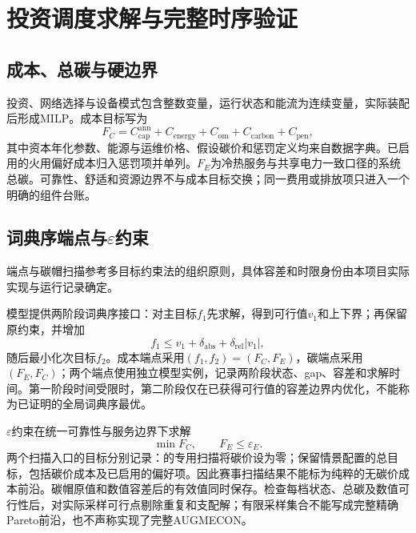\section{投资调度求解与完整时序验证}

\subsection{成本、总碳与硬边界}

投资、网络选择与设备模式包含整数变量，运行状态和能流为连续变量，实际装配后形成MILP。成本目标写为
\begin{equation}
F_C=C_{\mathrm{cap}}^{\mathrm{ann}}+C_{\mathrm{energy}}
+C_{\mathrm{om}}+C_{\mathrm{carbon}}+C_{\mathrm{pen}},
\label{eq:cost-objective}
\end{equation}
其中资本年化参数、能源与运维价格、假设碳价和惩罚定义均来自数据字典。已启用的火用偏好成本归入惩罚项并单列。$F_E$为冷热服务与共享电力一致口径的系统总碳。可靠性、舒适和资源边界不与成本目标交换；同一费用或排放项只进入一个明确的组件台账。

\subsection{词典序端点与\texorpdfstring{$\varepsilon$}{epsilon}约束}

端点与碳帽扫描参考多目标约束法的组织原则，具体容差和时限身份由本项目实际实现与运行记录确定。

模型提供两阶段词典序接口：对主目标$f_1$先求解，得到可行值$v_1$和上下界；再保留原约束，并增加
\begin{equation}
f_1\leq v_1+\delta_{\mathrm{abs}}+\delta_{\mathrm{rel}}|v_1|,
\label{eq:lexicographic}
\end{equation}
随后最小化次目标$f_2$。成本端点采用$(f_1,f_2)=(F_C,F_E)$，碳端点采用$(F_E,F_C)$；两个端点使用独立模型实例，记录两阶段状态、gap、容差和求解时间。第一阶段时间受限时，第二阶段仅在已获得可行值的容差边界内优化，不能称为已证明的全局词典序最优。

$\varepsilon$约束在统一可靠性与服务边界下求解
\begin{equation}
\min F_C,\qquad F_E\leq\varepsilon_E.
\label{eq:epsilon-constraint}
\end{equation}
两个扫描入口的目标分别记录：的专用扫描将碳价设为零；保留情景配置的总目标，包括碳价成本及已启用的偏好项。因此赛事扫描结果不能标为纯粹的无碳价成本前沿。碳帽原值和数值容差后的有效值同时保存。检查每档状态、总碳及数值可行性后，对实际采样可行点剔除重复和支配解；有限采样集合不能写成完整精确Pareto前沿，也不声称实现了完整AUGMECON。

